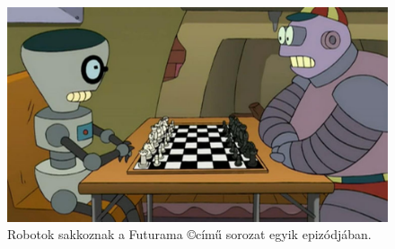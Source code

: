 \documentclass[twoside, a4paper, 12pt]{article}
\title{\THESISTITLE}
\author{\THESISAUTHOR}
\date{\THESISDEFENCEYEAR}
\begin{document}
\pagestyle{empty}


\cleardoublepage

\null
\vspace*{\fill}
\begin{figure}[htbp]
	\centering
	\includegraphics[width=1.0\textwidth]{img/bots_chess.png}
	\caption{Robotok sakkoznak a Futurama \copyright című sorozat egyik epizódjában.}
	\label{fig:bots_chess}
\end{figure}
\vspace*{\fill}
\null
\cleardoublepage

\tableofcontents
\cleardoublepage


\pagestyle{plain}
\setcounter{page}{1}











































\newpage
\end{document}
